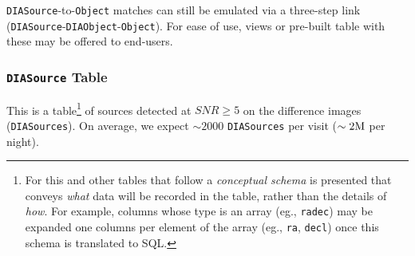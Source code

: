 \documentclass[12pt]{article}
\newcommand{\code}[1]{\texttt{#1}}
\newcommand{\DIASource}{\code{DIASource}\xspace}
\newcommand{\DIASources}{\code{DIASources}\xspace}
\newcommand{\DIAObject}{\code{DIAObject}\xspace}
\newcommand{\DIAObjects}{\code{DIAObjects}\xspace}
\newcommand{\DB}{{Level 1 database}\xspace}
\newcommand{\Object}{\code{Object}\xspace}
\newcommand{\SSObject}{\code{SSObject}\xspace}
\begin{document}
\vspace{2ex}
\DIASource-to-\Object matches can still be emulated via a three-step link (\DIASource-\DIAObject-\Object). For ease of use, views or pre-built table with these may be offered to end-users.


\subsubsection{\DIASource Table}

This is a table\footnote{For this and other tables that follow a {\em conceptual schema} is presented that conveys {\em what} data will be recorded in the table, rather than the details of {\em how}. For example, columns whose type is an array (eg., \texttt{radec}) may be expanded one columns per element of the array (eg., \texttt{ra}, \texttt{decl}) once this schema is translated to SQL.} of sources detected at $SNR \geq 5$ on the difference images (\DIASources). On average, we expect $\sim 2000$ \DIASources per visit ($\sim 2{\rm M}$ per night).
\end{document}
